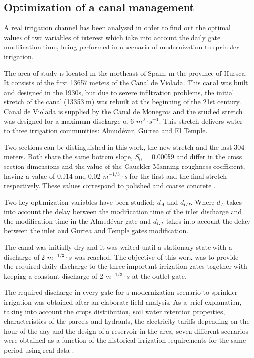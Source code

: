 \documentclass[review,authoryear]{elsarticle}
\begin{document}
\subsection{Optimization of a canal management}

A real irrigation channel has been analysed in order to find out the optimal values of two
variables of interest which take into account the daily gate modification time, being performed
in a scenario of modernization to sprinkler irrigation.

The area of study is located in the northeast of Spain, in the province of Huesca. It consists of
the first 13657 meters of the Canal de Violada. This canal was built and designed in the 1930s, 
but due to severe infiltration problems, the initial stretch of the canal (13353 m) was rebuilt at 
the beginning of the 21st century. Canal de Violada is supplied by the Canal de Monegros and the studied 
stretch was designed for a maximum discharge of 6 $m^3 \cdot s^{-1}$. This stretch delivers water to three irrigation 
communities: Almudévar, Gurrea and El Temple. 

Two sections can be distinguished in this work, the new stretch and the last 304 meters. Both share the 
same bottom slope, $S_0$ = 0.00059 and differ in the cross section dimensions and the value of the Gauckler-Manning 
roughness coefficient, having a value of 0.014 and 0.02 $m^{-1/3}\cdot s$ for the first and the final stretch 
respectively. These values correspond to polished and coarse concrete \citet{Chow59}.

Two key optimization variables have been studied: $d_A$ and $d_{GT}$. Where $d_A$ takes into account the delay between 
the modification time of the inlet discharge and the modification time in the Almudévar gate and $d_{GT}$ takes into account 
the delay between the inlet and Gurrea and Temple gates modification.

The canal was initially dry and it was waited until a stationary state with a discharge of 2 $m^{-1/3}\cdot s$ was reached. 
The objective of this work was to provide the required daily discharge to the three important irrigation gates together 
with keeping a constant discharge of 2 $m^{-1/3}\cdot s$ at the outlet gate. 

The required discharge in every gate for a modernization scenario to sprinkler irrigation was obtained after an elaborate 
field analysis. As a brief explanation, taking into account the crops distribution, soil water retention properties, 
characteristics of the parcels and hydrants, the electricity tariffs depending on the hour of the day and the design of a 
reservoir in the area, seven different scenarios were obtained as a function of the historical irrigation requirements for 
the same period using real data \citet{Zapata09}.
\end{document}
